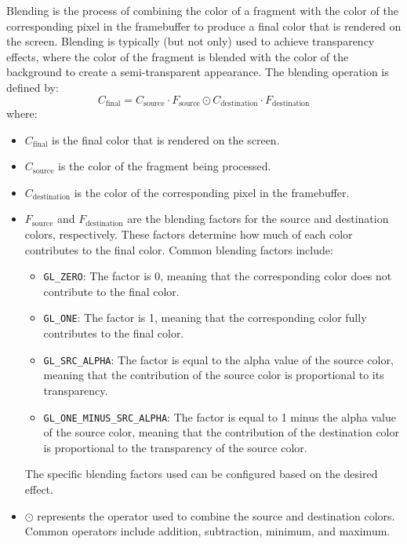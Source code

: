 Blending is the process of combining the color of a fragment with the color of the corresponding pixel in the framebuffer to produce a final color that is rendered on the screen. Blending is typically (but not only) used to achieve transparency effects, where the color of the fragment is blended with the color of the background to create a semi-transparent appearance. The blending operation is defined by:
\begin{equation*}
    C_{\text{final}} = C_{\text{source}} \cdot F_{\text{source}} \odot  C_{\text{destination}} \cdot F_{\text{destination}}
\end{equation*}
where:
\begin{itemize}
    \item $C_{\text{final}}$ is the final color that is rendered on the screen.
    \item $C_{\text{source}}$ is the color of the fragment being processed.
    \item $C_{\text{destination}}$ is the color of the corresponding pixel in the framebuffer.
    \item $F_{\text{source}}$ and $F_{\text{destination}}$ are the blending factors for the source and destination colors, respectively. These factors determine how much of each color contributes to the final color. Common blending factors include:
    \begin{itemize}
        \item \texttt{GL\_ZERO}: The factor is 0, meaning that the corresponding color does not contribute to the final color.
        \item \texttt{GL\_ONE}: The factor is 1, meaning that the corresponding color fully contributes to the final color.
        \item \texttt{GL\_SRC\_ALPHA}: The factor is equal to the alpha value of the source color, meaning that the contribution of the source color is proportional to its transparency.
        \item \texttt{GL\_ONE\_MINUS\_SRC\_ALPHA}: The factor is equal to 1 minus the alpha value of the source color, meaning that the contribution of the destination color is proportional to the transparency of the source color.
    \end{itemize}
    The specific blending factors used can be configured based on the desired effect.
    \item $\odot$ represents the operator used to combine the source and destination colors. Common operators include addition, subtraction, minimum, and maximum.
\end{itemize}


